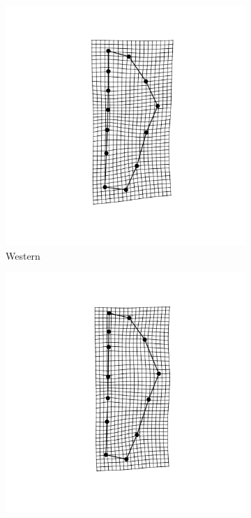 \documentclass[12pt,letterpaper]{article}\usepackage{graphicx, color}
\begin{document}
\begin{figure}[ht]
  \begin{subfigure}[b]{0.4\textwidth}
    \centering
    \includegraphics[width = \textwidth]{figure/mshape_3}
    \caption{Western}
    \label{fig:mean_shape3}
  \end{subfigure}
  \begin{subfigure}[b]{0.4\textwidth}
    \centering
    \includegraphics[width = \textwidth]{figure/mshape_4}

\end{subfigure}
\end{figure}
\end{document}
